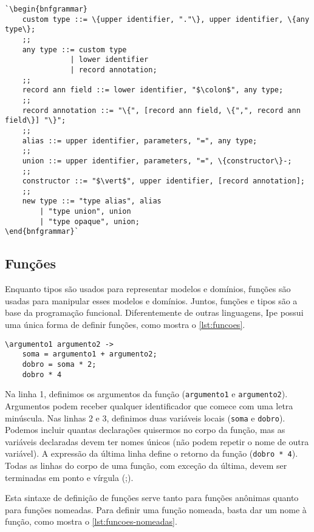 \begin{lstlisting}[label={grammar:custom-types},caption={Definição de novos tipos em EBNF},escapechar=`,numbers=none]
`\begin{bnfgrammar}
    custom type ::= \{upper identifier, "."\}, upper identifier, \{any type\};
    ;;
    any type ::= custom type
               | lower identifier
               | record annotation;
    ;;
    record ann field ::= lower identifier, "$\colon$", any type;
    ;;
    record annotation ::= "\{", [record ann field, \{",", record ann field\}] "\}";
    ;;
    alias ::= upper identifier, parameters, "=", any type;
    ;;
    union ::= upper identifier, parameters, "=", \{constructor\}-;
    ;;
    constructor ::= "$\vert$", upper identifier, [record annotation];
    ;;
    new type ::= "type alias", alias
        | "type union", union
        | "type opaque", union;
\end{bnfgrammar}`
\end{lstlisting}

\subsection{Funções}

Enquanto tipos são usados para representar modelos e domínios, funções são
usadas para manipular esses modelos e domínios. Juntos, funções e tipos são a
base da programação funcional. Diferentemente de outras linguagens, Ipe possui
uma única forma de definir funções, como mostra o \autoref{lst:funcoes}.

\begin{lstlisting}[label={lst:funcoes},caption={Exemplo de como definir uma função}]
\argumento1 argumento2 ->
    soma = argumento1 + argumento2;
    dobro = soma * 2;
    dobro * 4
\end{lstlisting}

Na linha 1, definimos os argumentos da função (\texttt{argumento1} e \texttt{argumento2}).
Argumentos podem receber qualquer identificador que comece com uma letra minúscula.
Nas linhas 2 e 3, definimos duas variáveis locais (\texttt{soma} e \texttt{dobro}).
Podemos incluir quantas declarações quisermos no corpo da função, mas as variáveis
declaradas devem ter nomes únicos (não podem repetir o nome de outra variável). A
expressão da última linha define o retorno da função (\texttt{dobro * 4}). Todas as linhas do corpo
de uma função, com exceção da última, devem ser terminadas em ponto e vírgula (;).

Esta sintaxe de definição de funções serve tanto para funções anônimas quanto para
funções nomeadas. Para definir uma função nomeada, basta dar um nome à função, como
mostra o \autoref{lst:funcoes-nomeadas}.


